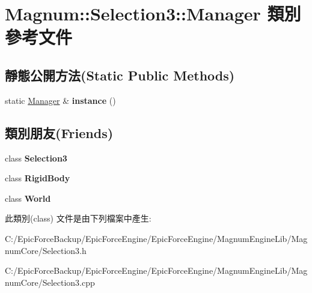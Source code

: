 \hypertarget{class_magnum_1_1_selection3_1_1_manager}{}\section{Magnum\+:\+:Selection3\+:\+:Manager 類別 參考文件}
\label{class_magnum_1_1_selection3_1_1_manager}
\subsection*{靜態公開方法(Static Public Methods)}
\begin{DoxyCompactItemize}
\item 
static \hyperlink{class_magnum_1_1_selection3_1_1_manager}{Manager} \& {\bfseries instance} ()\hypertarget{class_magnum_1_1_selection3_1_1_manager_a941c59ba62c32db6b07fb69c2a1f6f0a}{}\label{class_magnum_1_1_selection3_1_1_manager_a941c59ba62c32db6b07fb69c2a1f6f0a}

\end{DoxyCompactItemize}
\subsection*{類別朋友(Friends)}
\begin{DoxyCompactItemize}
\item 
class {\bfseries Selection3}\hypertarget{class_magnum_1_1_selection3_1_1_manager_a47be81a0b31f3baf32d05bcb9a39f47d}{}\label{class_magnum_1_1_selection3_1_1_manager_a47be81a0b31f3baf32d05bcb9a39f47d}

\item 
class {\bfseries Rigid\+Body}\hypertarget{class_magnum_1_1_selection3_1_1_manager_abb8b03bec6b0a8e0834c8358c93039d2}{}\label{class_magnum_1_1_selection3_1_1_manager_abb8b03bec6b0a8e0834c8358c93039d2}

\item 
class {\bfseries World}\hypertarget{class_magnum_1_1_selection3_1_1_manager_a7b4bcdf992c21ae83363f25df05b1d25}{}\label{class_magnum_1_1_selection3_1_1_manager_a7b4bcdf992c21ae83363f25df05b1d25}

\end{DoxyCompactItemize}


此類別(class) 文件是由下列檔案中產生\+:\begin{DoxyCompactItemize}
\item 
C\+:/\+Epic\+Force\+Backup/\+Epic\+Force\+Engine/\+Epic\+Force\+Engine/\+Magnum\+Engine\+Lib/\+Magnum\+Core/Selection3.\+h\item 
C\+:/\+Epic\+Force\+Backup/\+Epic\+Force\+Engine/\+Epic\+Force\+Engine/\+Magnum\+Engine\+Lib/\+Magnum\+Core/Selection3.\+cpp\end{DoxyCompactItemize}
